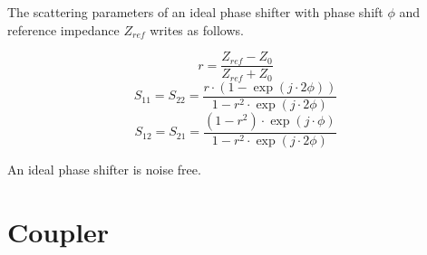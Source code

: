 The scattering parameters of an ideal phase shifter with phase shift
$\phi$ and reference impedance $Z_{ref}$ writes as follows.

\begin{equation}
r = \frac{Z_{ref}-Z_0}{Z_{ref}+Z_0}
\end{equation}
\begin{equation}
S_{11} = S_{22} = \frac{r\cdot\left(1-\exp\left(j\cdot 2\phi\right)\right)}{1-r^2\cdot\exp\left(j\cdot 2\phi\right)}
\end{equation}
\begin{equation}
S_{12} = S_{21} = \frac{(1-r^2)\cdot\exp\left(j\cdot\phi\right)}{1-r^2\cdot\exp\left(j\cdot 2\phi\right)}
\end{equation}

An ideal phase shifter is noise free.


\section{Coupler}


